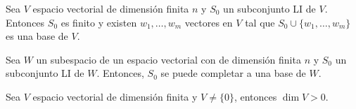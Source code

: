 \documentclass[handout]{beamer} %
\newcommand{\la}{\langle}
\newcommand{\ra}{\rangle}
\begin{document}
        \begin{frame}
        
        
        \begin{teorema}\label{completar-bases}
        Sea $V$ espacio vectorial de dimensión finita $n$ y $S_0$ un subconjunto LI de $V$. Entonces $S_0$  es finito  y existen $w_1,\ldots,w_m$ vectores en  $V$ tal que  $S_0 \cup \{w_1,\ldots,w_m\}$ es una base de $V$. 
        \end{teorema}
        
        \pause
        
        
        \begin{corolario}
            Sea $W$  un subespacio de un espacio vectorial con de dimensión finita $n$ y $S_0$ un subconjunto LI de $W$. Entonces, $S_0$ se puede completar a una base de $W$. 
        \end{corolario}
        
        \pause
        \begin{corolario}
            Sea $V$ espacio vectorial de dimensión finita y $V \ne \{0\}$, entonces $\dim V >0$.
        \end{corolario}
        
        \end{frame}
        
        
        
        
        
\end{document}
